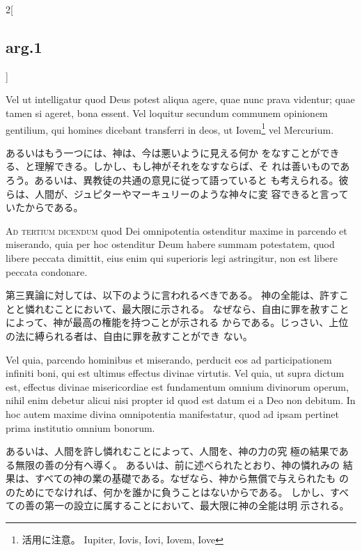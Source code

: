 \documentclass[paper=a4paper,fontsize=10pt,jafontsize=9pt,titlepage]{jlreq}
\begin{document}
\begin{paracol}{2}[\subsection{arg.1}]
\switchcolumn*

Vel ut intelligatur quod Deus
potest aliqua agere, quae nunc prava videntur; quae tamen si ageret,
bona essent. Vel loquitur secundum communem opinionem gentilium, qui
homines dicebant transferri in deos, ut Iovem\footnote{活用に注意。
 Iupiter, Iovis, Iovi, Iovem, Iove} vel Mercurium.

\switchcolumn

あるいはもう一つには、神は、今は悪いように見える何か
 をなすことができる、と理解できる。しかし、もし神がそれをなすならば、そ
 れは善いものであろう。あるいは、異教徒の共通の意見に従って語っていると
 も考えられる。彼らは、人間が、ジュピターやマーキュリーのような神々に変
 容できると言っていたからである。

\switchcolumn*[\subsection{ad.3}]

{\scshape Ad tertium dicendum} quod Dei omnipotentia
ostenditur maxime in parcendo et miserando, quia per hoc ostenditur Deum
habere summam potestatem, quod libere peccata dimittit, eius enim qui
superioris legi astringitur, non est libere peccata condonare.

\switchcolumn

第三異論に対しては、以下のように言われるべきである。
神の全能は、許すことと憐れむことにおいて、最大限に示される。
なぜなら、自由に罪を赦すことによって、神が最高の権能を持つことが示される
 からである。じっさい、上位の法に縛られる者は、自由に罪を赦すことができ
 ない。

\switchcolumn*

Vel quia,
parcendo hominibus et miserando, perducit eos ad participationem
infiniti boni, qui est ultimus effectus divinae virtutis. Vel quia, ut
supra dictum est, effectus divinae misericordiae est fundamentum omnium
divinorum operum, nihil enim debetur alicui nisi propter id quod est
datum ei a Deo non debitum. In hoc autem maxime divina omnipotentia
manifestatur, quod ad ipsam pertinet prima institutio omnium bonorum.

\switchcolumn

あるいは、人間を許し憐れむことによって、人間を、神の力の究
 極の結果である無限の善の分有へ導く。
あるいは、前に述べられたとおり、神の憐れみの
 結果は、すべての神の業の基礎である。なぜなら、神から無償で与えられたも
 ののためにでなければ、何かを誰かに負うことはないからである。
しかし、すべての善の第一の設立に属することにおいて、最大限に神の全能は明
 示される。


\end{paracol}
\end{document}

